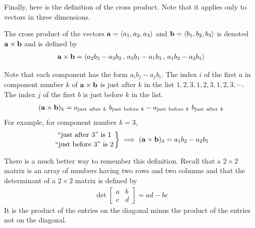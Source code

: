\noindent
Finally, here is the definition of the cross product. Note that it applies only to vectors in three dimensions.

\begin{defn}\label{def:crossProd}
The cross product of the vectors $\mathbf{a}=\left< a_1,a_2,a_3\right>$ and 
$\mathbf{b}=\left< b_1,b_2,b_3\right>$ is denoted $\mathbf{a}\times\mathbf{b}$ 
and is defined by
\begin{align*}
\mathbf{a}\times\mathbf{b} = \left< a_2b_3-a_3b_2\,,\, a_3b_1-a_1b_3\,,\, a_1b_2-a_2b_1\right> 
\end{align*}
\end{defn}

Note that each component has the form $a_ib_j-a_jb_i$. The index $i$ of
the first $a$ in component number $k$ of $\mathbf{a}\times\mathbf{b}$
is just after $k$ in the list $1,2,3,1,2,3,1,2,3,\cdots$. 
The index $j$ of the first $b$ is just before $k$ in the list. 
\begin{align*}
(\mathbf{a}\times\mathbf{b})_k
=a_{{\rm just\  after\  }k}\ b_{{\rm just\  before\  }k}
-a_{{\rm just\  before\  }k}\ b_{{\rm just\  after\  }k}
\end{align*}
For example, for component number $k=3$,
\begin{align*}
\left.{\text{``just after 3'' is 1}}\atop{\text{``just before 3'' is 2}}\right\}
\implies (\mathbf{a}\times\mathbf{b})_3= a_1b_2-a_2b_1
\end{align*}


There is a much better way to remember this definition. Recall that
a $2\times 2$ matrix is an array of numbers having two rows and two columns
and that the determinant of a $2\times 2$ matrix is  defined by
\begin{align*}
\det \left[\begin{matrix}a& b\\ c&d\end{matrix}\right]=ad-bc
\end{align*}
It is the product of the entries on the diagonal minus the product
of the entries not on the diagonal. 

